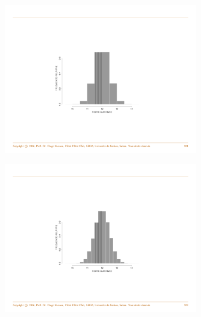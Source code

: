 \documentclass[notes=show,smaller,handout]{beamer}\usepackage[]{graphicx}\usepackage[]{color}
\begin{document}
\begin{frame}{\secname}
  \begin{example}[continued]
  \begin{figure}[ptb]\centering
  \includegraphics[width=0.75\textwidth,height=0.75\textheight]{img/hist1.pdf}
  \end{figure}
  \end{example}
\end{frame}

\begin{frame}{\secname}
  \begin{example}[continued]
  \begin{figure}[ptb]\centering
  \includegraphics[width=0.75\textwidth,height=0.75\textheight]{img/hist2.pdf}
  \end{figure}
  \end{example}
\end{frame}
\end{document}
